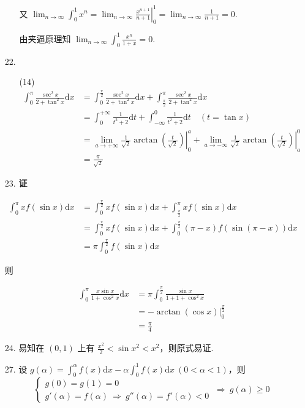 \documentclass[oneside]{ctexbook} %
\begin{document}
\begin{enumerate}
\begin{enumerate}
        又 $\displaystyle\lim_{n \to \infty} \int_0^1 x^n = \lim_{n \to \infty} \left. \frac{x^{n+1}}{n+1} \right|_0^1 = \lim_{n \to \infty} \frac 1 {n+1} = 0$.
        
        由夹逼原理知 $\displaystyle\lim_{n \to \infty} \int_0^1 \frac{x^n}{1+x} = 0$.
    \end{enumerate}
    \item[22.]
    \begin{enumerate}
        \item[(14)]
        $$
        \begin{aligned}
            \int_0^{\pi} \frac{\sec^2 x}{2 + \tan^2 x} \mathrm dx &= \int_0^{\frac \pi 2} \frac{\sec^2 x}{2 + \tan^2 x} \mathrm dx + \int_{\frac \pi 2}^{\pi} \frac{\sec^2 x}{2 + \tan^2 x} \mathrm dx \\
            &= \int_{0}^{+\infty} \frac 1 {t^2 + 2} \mathrm dt + \int_{-\infty}^0 \frac 1 {t^2 + 2} \mathrm dt \quad (t = \tan x) \\
            &= \lim_{a \to +\infty} \left. \frac 1 {\sqrt 2} \arctan \left( \frac t {\sqrt 2} \right) \right|_0^a + \lim_{a \to -\infty} \left. \frac 1 {\sqrt 2} \arctan \left( \frac t {\sqrt 2} \right) \right|_a^0 \\
            &= \frac \pi {\sqrt 2}
        \end{aligned}
        $$
    \end{enumerate}
    \item[23.]
    \textbf{证}
    
    $$
    \begin{aligned}
        \int_0^{\pi} x f(\sin x) \mathrm dx &= \int_0^{\frac \pi 2} x f(\sin x) \mathrm dx + \int_{\frac \pi 2}^{\pi} x f(\sin x) \mathrm dx \\
        &= \int_0^{\frac \pi 2} x f(\sin x) \mathrm dx + \int_0^{\frac \pi 2} (\pi - x) f( \sin(\pi - x) ) \mathrm dx \\
        &= \pi \int_0^{\frac \pi 2} f(\sin x) \mathrm dx
    \end{aligned}
    $$
    
    则
    
    $$
    \begin{aligned}
        \int_0^{\pi} \frac{x \sin x}{1 + \cos^2 x} \mathrm dx &= \pi \int_0^{\frac \pi 2} \frac{\sin x}{1 + 1 + \cos^2 x} \\
        &= -\arctan(\cos x) \bigg|_0^{\frac \pi 2} \\
        &= \frac \pi 4
    \end{aligned}
    $$
    \item[24.]
    易知在 $(0, 1)$ 上有 $\frac {x^2} 2 < \sin x^2 < x^2$，则原式易证.
    \item[27.]
    设 $g(\alpha) = \int_0^{\alpha} f(x) \mathrm dx - \alpha \int_0^1 f(x) \mathrm dx \ (0 < \alpha < 1)$，则
    $$
    \begin{cases}
        g(0) = g(1) = 0 \\
        g'(\alpha) = f(\alpha) \ \Rightarrow \ g''(\alpha) = f'(\alpha) < 0
    \end{cases}
    \ \Rightarrow \ g(\alpha) \geqslant 0
    $$
\end{enumerate}
\end{document}
